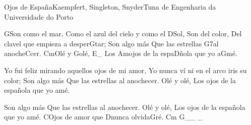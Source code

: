 \begin{musica}{Ojos de España}{Kaempfert, Singleton, Snyder}{Tuna de Engenharia da Universidade do Porto}

\ac{G}{Son} como el mar,
Como el azul del cielo y como el \ac{D}{Sol},
Son del color,
Del clavel que empieza a desper\ac{G}{tar};
Son algo más
Que las estrellas \ac{G7}{al} anoche\ac{C}{cer}.
\ac{Cm}{Olé} y \ac{G}{olé}, \ac{E}{}_
Los \ac{Am}{o}jos de la espa\ac{D}{ño}la que yo a\ac{G}{mé}.

Yo fui feliz mirando aquellos ojos de mi amor,
Yo nunca ví ni en el arco iris su color;
Son algo más
Que las estrellas al anochecer.
Olé y olé,
Los ojos de la española que yo amé.


Son algo más
Que las estrellas al anochecer.
Olé y olé,
Los ojos de la española que yo amé.
\ac{C}{O}jos de amor que \ac{D}{nun}ca olvida\ac{G}{ré}. \ac{Cm G}{}__ _

\end{musica}
